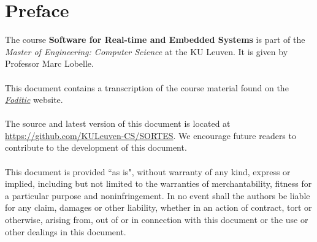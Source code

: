 \documentclass[main.tex]{subfiles}
\begin{document}
\chapter*{Preface}
The course \textbf{Software for Real-time and Embedded Systems} is part of the \textit{Master of Engineering: Computer Science} at the KU Leuven. It is given by Professor Marc Lobelle.
\\\\
This document contains a transcription of the course material found on the \href{http://foditic.org}{\textit{Foditic}} website.
\\\\
The source and latest version of this document is located at \url{https://github.com/KULeuven-CS/SORTES}. We encourage future readers to contribute to the development of this document.
\\\\
This document is provided ``as is", without warranty of any kind, express or implied, including but not limited to the warranties of merchantability, fitness for a particular purpose and noninfringement.
In no event shall the authors be liable for any claim, damages or other liability, whether in an action of contract, tort or otherwise, arising from, out of or in connection with this document or the use or other dealings in this document.
\end{document}
